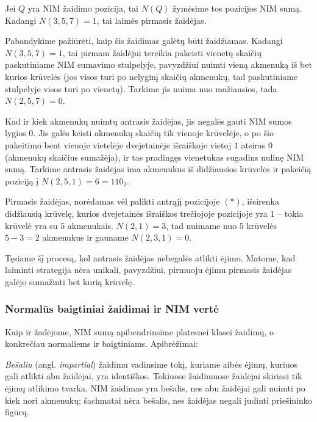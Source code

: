 \begin{sprendimas}
  Jei $Q$ yra NIM žaidimo pozicija, tai $N(Q)$ žymėsime tos pozicijos NIM sumą.
  Kadangi $N(3,5,7)=1$, tai laimės pirmasis žaidėjas.

  Pabandykime pažiūrėti, kaip šis žaidimas galėtų būti žaidžiamas. Kadangi
  $N(3,5,7)=1$, tai pirmam žaidėjui tereikia pakeisti vienetų skaičių
  paskutiniame NIM sumavimo stulpelyje, pavyzdžiui nuimti vieną akmenuką iš
  bet kurios krūvelės (jos visos turi po nelyginį skaičių akmenukų, tad
  paskutiniame stulpelyje visos turi po vienetą). Tarkime jis nuima nuo
  mažiausios, tada $N(2,5,7)=0$.

  Kad ir kiek akmenukų nuimtų antrasis žaidėjas, jis negalės gauti NIM sumos
  lygios $0$. Jis galės keisti akmenukų skaičių tik vienoje krūvelėje, o po šio
  pakeitimo bent vienoje vietelėje dvejetainėje išraiškoje vietoj $1$ atsiras
  $0$ (akmenukų skaičius sumažėja), ir tas pradingęs vienetukas sugadins
  nulinę NIM sumą. Tarkime antrasis žaidėjas ima akmenukus iš didžiausios
  krūvelės ir pakeičią poziciją į $N(2,5,1)=6=110_2$.

  Pirmasis žaidėjas, norėdamas vėl palikti antrąjį pozicijoje $(*)$,
  išsirenka didžiausią krūvelę, kurios dvejetainės išraiškos trečiojoje
  pozicijoje yra $1$ -- tokia krūvelė yra su $5$ akmenukais. $N(2,1)=3$, tad
  nuimame nuo $5$ krūvelės $5-3=2$ akmenukus ir gauname $N(2,3,1)=0$. 

  Tęsiame šį procesą, kol antrasis žaidėjas nebegalės atlikti ėjimo. Matome,
  kad laiminti strategija nėra unikali, pavyzdžiui, pirmuoju ėjimu pirmasis
  žaidėjas galėjo sumažinti bet kurią krūvelę.
\end{sprendimas}

\subsubsection{Normalūs baigtiniai žaidimai ir NIM vertė}

Kaip ir žadėjome, NIM sumą apibendrinsime platesnei klasei žaidimų, o
konkrečiau normaliems ir baigtiniams. Apibrėžimai:

\begin{api}
  \emph{Bešaliu} (angl. \emph{impartial}) žaidimu vadinsime tokį, kuriame
  aibės ėjimų, kuriuos gali atlikti abu žaidėjai, yra identiškos.  Tokiuose
  žaidimuose žaidėjai skiriasi tik ėjimų atlikimo tvarka. NIM žaidimas yra
  bešalis, nes abu žaidėjai gali nuimti po kiek nori akmenukų; šachmatai
  nėra bešalis, nes žaidėjas negali judinti priešininko figūrų. 
\end{api}

